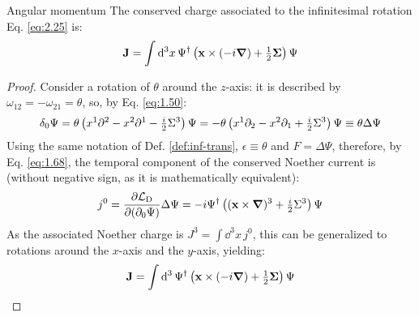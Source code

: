 \begin{proposition}{Angular momentum}{}
  The conserved charge associated to the infinitesimal rotation Eq. \ref{eq:2.25} is:
  \begin{equation}
    \mathbf{J} = \int \mathrm{d}^3x\, \Psi^\dagger \left( \mathbf{x} \times (-i \boldsymbol{\nabla}) + \tfrac{1}{2} \boldsymbol{\Sigma} \right) \Psi
    \label{eq:2.26}
  \end{equation}

  \tcblower

  \begin{proof}
    Consider a rotation of $ \theta $ around the $ z $-axis: it is described by $ \omega_{12} = - \omega_{21} = \theta $, so, by Eq. \ref{eq:1.50}:
    \begin{equation*}
      \delta_0 \Psi = \theta \left( x^1 \partial^2 - x^2 \partial^1 - \tfrac{i}{2} \Sigma^3 \right) \Psi = - \theta \left( x^1 \partial_2 - x^2 \partial_1 + \tfrac{i}{2} \Sigma^3 \right) \Psi \equiv \theta \Delta \Psi
    \end{equation*}
    Using the same notation of Def. \ref{def:inf-trans}, $ \epsilon \equiv \theta $ and $ F = \Delta \Psi $, therefore, by Eq. \ref{eq:1.68}, the temporal component of the conserved Noether current is (without negative sign, as it is mathematically equivalent):
    \begin{equation*}
      j^0 = \frac{\partial \mathcal{L}_\text{D}}{\partial (\partial_0 \Psi)} \Delta \Psi = - i \Psi^\dagger \left( (\mathbf{x} \times \boldsymbol{\nabla})^3 + \tfrac{i}{2} \Sigma^3 \right) \Psi
    \end{equation*}
    As the associated Noether charge is $ J^3 = \int \dd^3x\, j^0 $, this can be generalized to rotations around the $ x $-axis and the $ y $-axis, yielding:
    \begin{equation*}
      \mathbf{J} = \int \mathrm{d}^3\, \Psi^\dagger \left( \mathbf{x} \times (-i \boldsymbol{\nabla}) + \tfrac{1}{2} \boldsymbol{\Sigma} \right) \Psi
    \end{equation*}
  \end{proof}
\end{proposition}

